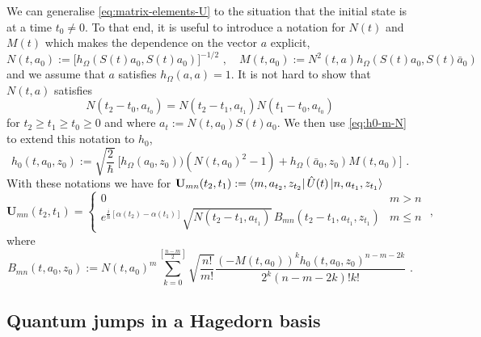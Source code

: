 \documentclass[12pt]{iopart} %
\begin{document}
We can generalise \eqref{eq:matrix-elements-U} to the situation that the initial state is at a time $t_0\neq 0$. To that end, it is useful to introduce a notation for $N(t)$ and $M(t)$ which makes the dependence on the vector $a$ explicit, 
\begin{equation}
    N(t,a_0):=\big[h_{\Omega}(S(t)a_0,S(t)a_0)\big]^{-1/2}\,\, ,\quad M(t,a_0):=N^2(t,a)h_{\Omega}(S(t)a_0,S(t)\bar a_0)
\end{equation}
and we assume that $a$ satisfies $h_{\Omega}(a,a)=1$. It is not hard to show that $N(t,a)$ satisfies 
\begin{equation}
    N(t_2-t_0,a_{t_0})=N(t_2-t_1,a_{t_1})N(t_1-t_0,a_{t_0})
\end{equation}
for $t_2\geq t_1\geq t_0\geq 0$ and where $a_t:=N(t,a_0)S(t)a_0$. We then use \eqref{eq:h0-m-N} to extend this notation to $h_0$, 
\begin{equation}
    h_0(t,a_0,z_0):=\sqrt{\frac{2}{\hbar}}\ 
\big[h_{\Omega}(a_0,z_0))(N(t,a_0)^2-1)+h_{\Omega}(\bar a_0,z_0)M(t,a_0)\big]\,\, .
\end{equation}
With these notations we have for  $\mathbf{U}_{mn}(t_2,t_1):=\bra{m,a_{t_2},z_{t_2}}\hat U(t)\ket{n,a_{t_1},z_{t_1}}$
\begin{equation}\label{eq:matrix-elements-U-t}
    \mathbf{U}_{mn}(t_2,t_1)=\begin{cases} 0 & m>n\\
e^{\frac{i}{\hbar}[\alpha(t_2)-\alpha(t_1)]}\sqrt{N(t_2-t_1,a_{t_1})}\, B_{mn}(t_2-t_1,a_{t_1},z_{t_1}) & m\leq n \end{cases}\,\, ,
\end{equation}
where 
\begin{equation}\label{eq:matrix-elements-A-t} %
 B_{mn}(t,a_0,z_0):=N(t,a_0)^m\sum_{k=0}^{[\frac{n-m}{2}]}\sqrt{\frac{n!}{m!}} \frac{(-M(t,a_0))^{k} h_0(t,a_0,z_0)^{n-m-2k}}{2^k(n-m-2k)!k!} \,\, .  
\end{equation}
\subsection{Quantum jumps in a Hagedorn basis}
\end{document}
